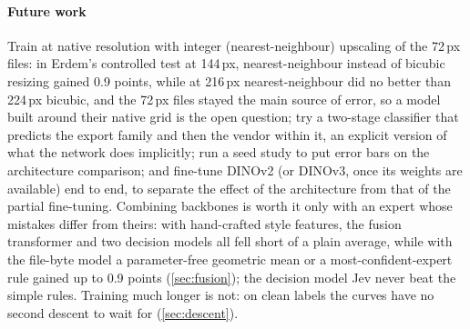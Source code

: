 \documentclass[11pt,a4paper]{article}
\begin{document}
\paragraph{Future work} Train at native resolution with integer (nearest-neighbour) upscaling of the 72\,px files: in Erdem's controlled test at 144\,px, nearest-neighbour instead of bicubic resizing gained 0.9 points, while at 216\,px nearest-neighbour did no better than 224\,px bicubic, and the 72\,px files stayed the main source of error, so a model built around their native grid is the open question; try a two-stage classifier that predicts the export family and then the vendor within it, an explicit version of what the network does implicitly; run a seed study to put error bars on the architecture comparison; and fine-tune DINOv2 (or DINOv3, once its weights are available) end to end, to separate the effect of the architecture from that of the partial fine-tuning. Combining backbones is worth it only with an expert whose mistakes differ from theirs: with hand-crafted style features, the fusion transformer and two decision models all fell short of a plain average, while with the file-byte model a parameter-free geometric mean or a most-confident-expert rule gained up to 0.9 points (\cref{sec:fusion}); the decision model Jev never beat the simple rules. Training much longer is not: on clean labels the curves have no second descent to wait for (\cref{sec:descent}).

\FloatBarrier
\small


\normalsize

\appendix
\end{document}
